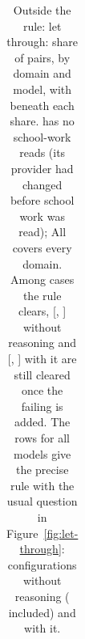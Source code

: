 \begin{table}[t]
\begin{tabular}{lcccccccc}
\bottomrule
\end{tabular}
\caption{Outside the rule: let through: share of pairs, by domain and model, with \IntervalsNote{} beneath each share.  has no school-work reads (its provider had changed before school work was read); All covers every domain. Among cases the rule clears, \StillClearedNoReasoning{} [\StillClearedNoReasoningLo{}, \StillClearedNoReasoningHi{}] without reasoning and \StillClearedReasoning{} [\StillClearedReasoningLo{}, \StillClearedReasoningHi{}] with it are still cleared once the failing is added. The rows for all models give the precise rule with the usual question in Figure~\ref{fig:let-through}: \NumModelsNoReasoning{} configurations without reasoning ( included) and \NumModelsReasoning{} with it.}
\label{tab:by-domain-letthrough}
\end{table}
